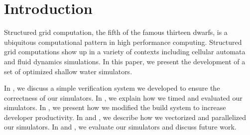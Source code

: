 \section{Introduction}\label{sec:intro}
Structured grid computation, the fifth of the famous thirteen dwarfs, is a
ubiquitous computational pattern in high performance computing. Structured grid
computations show up in a variety of contexts including cellular automata and
fluid dynamics simulations. In this paper, we present the development of a set
of optimized shallow water simulators.

In , we discuss a simple verification system we developed
to ensure the correctness of our simulators. In , we explain
how we timed and evaluated our simulators. In , we present how
we modified the build system to increase developer productivity. In
 and , we describe how we
vectorized and parallelized our simulators. In  and
, we evaluate our simulators and discuss future work.
